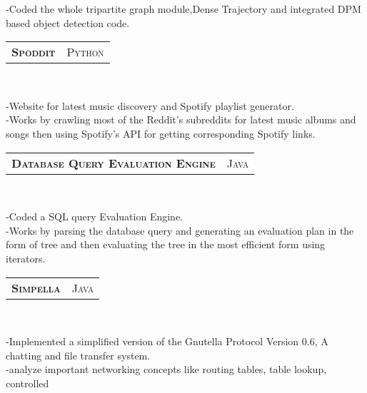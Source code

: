 \documentclass[10pt,a4paper,oneside]{article}
\begin{document}
\begin{minipage}[t]{0.63\textwidth}
\begin{adjustwidth}{7pt}{0pt}
{        -Coded the whole tripartite graph module,Dense
        Trajectory and integrated DPM based object detection code.}\\
        \end{adjustwidth}
        \begin{tabular}{c|c}
            \textbf{\normalsize S\textsc{poddit}}
            &\textmd{\normalsize P\textsc{ython}}
        \end{tabular}\\
         \vspace{-4mm}
        \begin{adjustwidth}{7pt}{0pt}
        {\footnotesize -Website for latest music
        discovery and Spotify playlist generator.\\
        -Works by crawling most of the Reddit's subreddits for
        latest music albums and songs then using Spotify's API for
        getting corresponding Spotify links.}\\
        \end{adjustwidth}
        \begin{tabular}{c|c}
            \textbf{\normalsize D\textsc{atabase} Q\textsc{uery}
            E\textsc{valuation} E\textsc{ngine}}
            &\textmd{\normalsize J\textsc{ava}}
        \end{tabular}\\
         \vspace{-4mm}
        \begin{adjustwidth}{7pt}{0pt}
        {\footnotesize -Coded a SQL query Evaluation Engine.\\
        -Works by parsing the database query and generating an evaluation plan in the form of tree and then evaluating the tree in the most efficient form using iterators.}\\
        \end{adjustwidth}
        \begin{tabular}{c|c}
            \textbf{\normalsize S\textsc{impella}}
            &\textmd{\normalsize J\textsc{ava}}
        \end{tabular}\\
         \vspace{-4mm}
        \begin{adjustwidth}{7pt}{0pt}
        {\footnotesize -Implemented a simplified version of the
        Gnutella Protocol Version 0.6, A chatting and file transfer
        system.\\
        -analyze important networking concepts like routing tables, table lookup, controlled
}
\end{adjustwidth}
\end{minipage}
\end{document}
